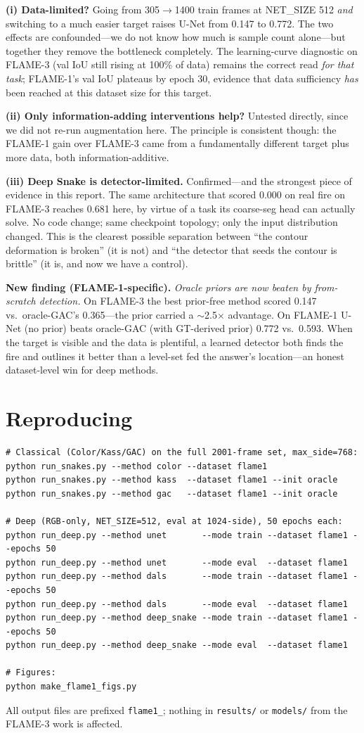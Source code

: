 \documentclass[10pt]{article}
\begin{document}
\textbf{(i) Data-limited?} Going from 305$\to$1400 train frames at NET\_SIZE
512 \emph{and} switching to a much easier target raises U-Net from 0.147 to
0.772. The two effects are confounded---we do not know how much is sample
count alone---but together they remove the bottleneck completely. The
learning-curve diagnostic on FLAME-3 (val IoU still rising at 100\% of data)
remains the correct read \emph{for that task}; FLAME-1's val IoU plateaus by
epoch 30, evidence that data sufficiency \emph{has} been reached at this
dataset size for this target.

\textbf{(ii) Only information-adding interventions help?} Untested directly,
since we did not re-run augmentation here. The principle is consistent though:
the FLAME-1 gain over FLAME-3 came from a fundamentally different target plus
more data, both information-additive.

\textbf{(iii) Deep Snake is detector-limited.} Confirmed---and the strongest
piece of evidence in this report. The same architecture that scored 0.000 on
real fire on FLAME-3 reaches 0.681 here, by virtue of a task its coarse-seg
head can actually solve. No code change; same checkpoint topology; only the
input distribution changed. This is the clearest possible separation between
``the contour deformation is broken'' (it is not) and ``the detector that
seeds the contour is brittle'' (it is, and now we have a control).

\textbf{New finding (FLAME-1-specific).} \emph{Oracle priors are now beaten by
from-scratch detection.} On FLAME-3 the best prior-free method scored 0.147 vs.\
oracle-GAC's 0.365---the prior carried a $\sim$2.5$\times$ advantage. On
FLAME-1 U-Net (no prior) beats oracle-GAC (with GT-derived prior) 0.772 vs.\
0.593. When the target is visible and the data is plentiful, a learned
detector both finds the fire and outlines it better than a level-set fed the
answer's location---an honest dataset-level win for deep methods.

\section{Reproducing}

\begin{verbatim}
# Classical (Color/Kass/GAC) on the full 2001-frame set, max_side=768:
python run_snakes.py --method color --dataset flame1
python run_snakes.py --method kass  --dataset flame1 --init oracle
python run_snakes.py --method gac   --dataset flame1 --init oracle

# Deep (RGB-only, NET_SIZE=512, eval at 1024-side), 50 epochs each:
python run_deep.py --method unet       --mode train --dataset flame1 --epochs 50
python run_deep.py --method unet       --mode eval  --dataset flame1
python run_deep.py --method dals       --mode train --dataset flame1 --epochs 50
python run_deep.py --method dals       --mode eval  --dataset flame1
python run_deep.py --method deep_snake --mode train --dataset flame1 --epochs 50
python run_deep.py --method deep_snake --mode eval  --dataset flame1

# Figures:
python make_flame1_figs.py
\end{verbatim}

All output files are prefixed \texttt{flame1\_}; nothing in
\texttt{results/} or \texttt{models/} from the FLAME-3 work is affected.
\end{document}
